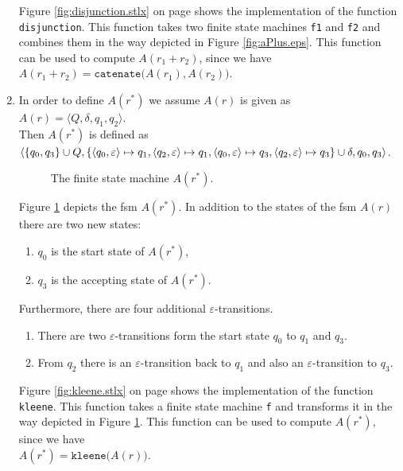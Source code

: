 \begin{enumerate}
      Figure \ref{fig:disjunction.stlx} on page \pageref{fig:disjunction.stlx} shows the
      implementation of the function \texttt{disjunction}.  This function takes two
      finite state machines \texttt{f1} and \texttt{f2} and combines them in the way
      depicted in Figure \ref{fig:aPlus.eps}.  This function can be used
      to compute $A(r_1 + r_2)$, since we have
      \\[0.2cm]
      \hspace*{1.3cm}
      $A(r_1 +r_2) = \mathtt{catenate}\bigl(A(r_1), A(r_2)\bigr)$.
\item In order to define $A(r^*)$ we assume $A(r)$ is given as
      \\[0.2cm]
      \hspace*{1.3cm}
      $A(r) = \langle Q, \delta, q_1, q_2 \rangle$.
      \\[0.2cm]
      Then  $A(r^*)$ is defined as
      \\[0.2cm]
      \hspace*{0.8cm}
       $\langle \{ q_0, q_3 \} \cup Q, 
                \{ \pair(q_0,\varepsilon) \mapsto q_1, \pair(q_2,\varepsilon) \mapsto q_1,
                   \pair(q_0,\varepsilon) \mapsto q_3, \pair(q_2,\varepsilon) \mapsto q_3 \} 
                   \cup \delta, q_0, q_3  \rangle$.
      \\[0.2cm]

      \begin{figure}[!ht]
        \centering
      \caption{The finite state machine $A(r^*)$.}
      \label{fig:aStar.eps}
      \end{figure}

      Figure \ref{fig:aStar.eps} depicts the fsm $A(r^*)$.
      In addition to the states of the fsm  $A(r)$ there are two new states:
      \begin{enumerate}
      \item $q_0$ is the start state of $A(r^*)$,
      \item $q_3$ is the accepting state of $A(r^*)$.
      \end{enumerate}
      Furthermore, there are four additional  $\varepsilon$-transitions.
      \begin{enumerate}
      \item There are two $\varepsilon$-transitions form the start state $q_0$ to $q_1$ and $q_3$.
      \item From $q_2$ there is an  $\varepsilon$-transition back to $q_1$ and also an
            $\varepsilon$-transition to $q_3$.
      \end{enumerate}
      Figure \ref{fig:kleene.stlx} on page \pageref{fig:kleene.stlx} shows the
      implementation of the function \texttt{kleene}.  This function takes a
      finite state machine \texttt{f} and transforms it in the way
      depicted in Figure \ref{fig:aStar.eps}.  This function can be used
      to compute $A(r^*)$, since we have
      \\[0.2cm]
      \hspace*{1.3cm}
      $A(r^*) = \mathtt{kleene}\bigl(A(r)\bigr)$.
 

\end{enumerate}
